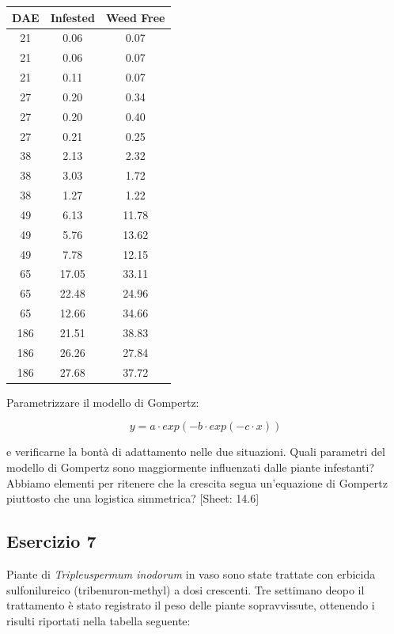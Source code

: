 \documentclass[a4paper,12pt,oneside]{book}
\begin{document}
\begin{longtable}[]{@{}ccc@{}}
\toprule()
DAE & Infested & Weed Free \\
\midrule()
\endhead
21 & 0.06 & 0.07 \\
21 & 0.06 & 0.07 \\
21 & 0.11 & 0.07 \\
27 & 0.20 & 0.34 \\
27 & 0.20 & 0.40 \\
27 & 0.21 & 0.25 \\
38 & 2.13 & 2.32 \\
38 & 3.03 & 1.72 \\
38 & 1.27 & 1.22 \\
49 & 6.13 & 11.78 \\
49 & 5.76 & 13.62 \\
49 & 7.78 & 12.15 \\
65 & 17.05 & 33.11 \\
65 & 22.48 & 24.96 \\
65 & 12.66 & 34.66 \\
186 & 21.51 & 38.83 \\
186 & 26.26 & 27.84 \\
186 & 27.68 & 37.72 \\
\bottomrule()
\end{longtable}

Parametrizzare il modello di Gompertz:

\[y = a \cdot exp(-b \cdot exp(-c \cdot x))\]

e verificarne la bontà di adattamento nelle due situazioni. Quali parametri del modello di Gompertz sono maggiormente influenzati dalle piante infestanti? Abbiamo elementi per ritenere che la crescita segua un'equazione di Gompertz piuttosto che una logistica simmetrica?
{[}Sheet: 14.6{]}

\hypertarget{esercizio-7-2}{%
\subsection{Esercizio 7}\label{esercizio-7-2}}

Piante di \emph{Tripleuspermum inodorum} in vaso sono state trattate con erbicida sulfonilureico (tribenuron-methyl) a dosi crescenti. Tre settimano deopo il trattamento è stato registrato il peso delle piante sopravvissute, ottenendo i risulti riportati nella tabella seguente:
\end{document}
